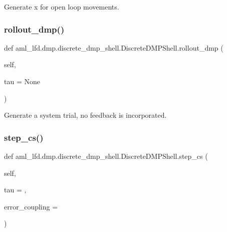 \begin{DoxyVerb}Generate x for open loop movements.
\end{DoxyVerb}
 \hypertarget{classaml__lfd_1_1dmp_1_1discrete__dmp__shell_1_1_discrete_d_m_p_shell_ad46fa7e783a6c38e19bb6f36fed76a8b}{}\label{classaml__lfd_1_1dmp_1_1discrete__dmp__shell_1_1_discrete_d_m_p_shell_ad46fa7e783a6c38e19bb6f36fed76a8b} 
\subsubsection{\texorpdfstring{rollout\+\_\+dmp()}{rollout\_dmp()}}
{\footnotesize\ttfamily def aml\+\_\+lfd.\+dmp.\+discrete\+\_\+dmp\+\_\+shell.\+Discrete\+D\+M\+P\+Shell.\+rollout\+\_\+dmp (\begin{DoxyParamCaption}\item[{}]{self,  }\item[{}]{tau = {\ttfamily None} }\end{DoxyParamCaption})}

\begin{DoxyVerb}Generate a system trial, no feedback is incorporated.\end{DoxyVerb}
 \hypertarget{classaml__lfd_1_1dmp_1_1discrete__dmp__shell_1_1_discrete_d_m_p_shell_aeff4509250d19885d751a439f3eff8f5}{}\label{classaml__lfd_1_1dmp_1_1discrete__dmp__shell_1_1_discrete_d_m_p_shell_aeff4509250d19885d751a439f3eff8f5} 
\subsubsection{\texorpdfstring{step\+\_\+cs()}{step\_cs()}}
{\footnotesize\ttfamily def aml\+\_\+lfd.\+dmp.\+discrete\+\_\+dmp\+\_\+shell.\+Discrete\+D\+M\+P\+Shell.\+step\+\_\+cs (\begin{DoxyParamCaption}\item[{}]{self,  }\item[{}]{tau = {},  }\item[{}]{error\+\_\+coupling = {} }\end{DoxyParamCaption})}

